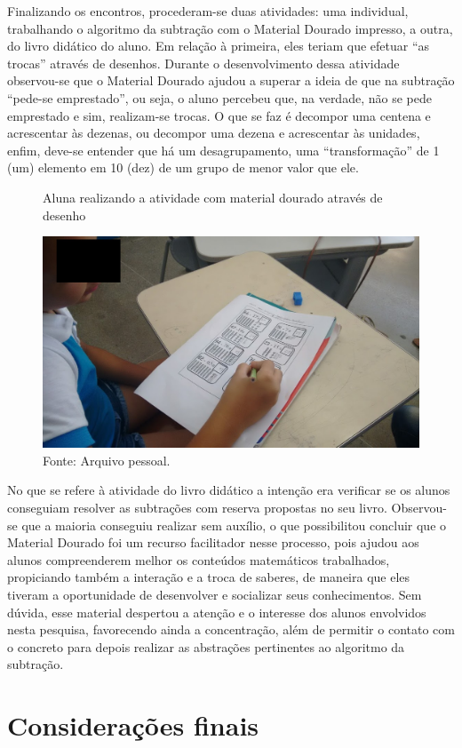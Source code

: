 \begin{refsection}
    Finalizando os encontros, procederam-se duas atividades: uma individual, trabalhando o algoritmo da subtração com o Material Dourado impresso, a outra, do livro didático do aluno. Em relação à primeira, eles teriam que efetuar “as trocas” através de desenhos. Durante o desenvolvimento dessa atividade observou-se que o Material Dourado ajudou a superar a ideia de que na subtração “pede-se emprestado”, ou seja, o aluno percebeu que, na verdade, não se pede emprestado e sim, realizam-se trocas. O que se faz é decompor uma centena e acrescentar às dezenas, ou decompor uma dezena e acrescentar às unidades, enfim, deve-se entender que há um desagrupamento, uma “transformação” de 1 (um) elemento em 10 (dez) de um grupo de menor valor que ele. 

    \begin{figure}[ht]%
        \centering%
        \caption{Aluna realizando a atividade com material dourado através de desenho}%
        \includegraphics[width=.5\textwidth]{articles/05-material-dourado-com/figura7.jpeg}%
        \caption*{Fonte: Arquivo pessoal.}%
        \label{fig:md-desenho}%
    \end{figure}%

    No que se refere à atividade do livro didático a intenção era verificar se os alunos conseguiam resolver as subtrações com reserva propostas no seu livro. Observou-se que a maioria conseguiu realizar sem auxílio, o que possibilitou concluir que o Material Dourado foi um recurso facilitador nesse processo, pois ajudou aos alunos compreenderem melhor os conteúdos matemáticos trabalhados, propiciando também a interação e a troca de saberes, de maneira que eles tiveram a oportunidade de desenvolver e socializar seus conhecimentos. Sem dúvida, esse material despertou a atenção e o interesse dos alunos envolvidos nesta pesquisa, favorecendo ainda a concentração, além de permitir o contato com o concreto para depois realizar as abstrações pertinentes ao algoritmo da subtração.

    \section{Considerações finais}


\end{refsection}
